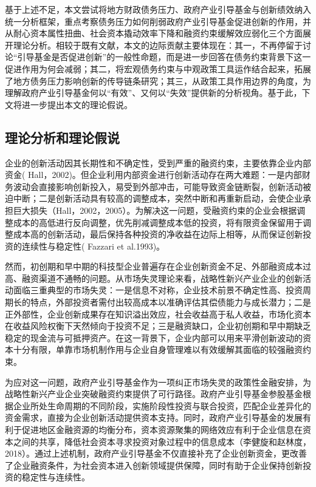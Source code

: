 \documentclass[UTF8,a4paper,zihao=5,fontset=fandol]{ctexart}
\begin{document}
基于上述不足，本文尝试将地方财政债务压力、政府产业引导基金与创新绩效纳入统一分析框架，重点考察债务压力如何削弱政府产业引导基金促进创新的作用，并从耐心资本属性扭曲、社会资本撬动效率下降和融资约束缓解效应弱化三个方面展开理论分析。相较于既有文献，本文的边际贡献主要体现在：其一，不再停留于讨论“引导基金是否促进创新”的一般性命题，而是进一步回答在债务约束背景下这一促进作用为何会减弱；其二，将宏观债务约束与中观政策工具运作结合起来，拓展了地方债务压力影响创新的传导链条研究；其三，从政策工具作用边界的角度，为理解政府产业引导基金何以“有效”、又何以“失效”提供新的分析视角。基于此，下文将进一步提出本文的理论假说。

\subsection{理论分析和理论假说}

企业的创新活动因其长期性和不确定性，受到严重的融资约束，主要依靠企业内部资金( Hall，2002)。但企业利用内部资金进行创新活动存在两大难题：一是内部财务波动会直接影响创新投入，易受到外部冲击，可能导致资金链断裂，创新活动被迫中断；二是创新活动具有较高的调整成本，突然中断和再重新启动，会使企业承担巨大损失（Hall，2002，2005）。为解决这一问题，受融资约束的企业会根据调整成本的高低进行反向调整，优先削减调整成本低的投资，将有限资金保留用于调整成本高的创新活动，最后保持各种投资的净收益在边际上相等，从而保证创新投资的连续性与稳定性( Fazzari et al.1993)。

然而，初创期和早中期的科技型企业普遍存在企业创新资金不足、外部融资成本过高、融资渠道不通畅的问题。从市场失灵理论来看，战略性新兴产业企业的创新活动面临三重典型的市场失灵：一是信息不对称，企业技术前景不确定性高、投资周期长的特点，外部投资者需付出较高成本以准确评估其偿债能力与成长潜力；二是正外部性，企业创新成果存在知识溢出效应，社会收益高于私人收益，市场化资本在收益风险权衡下天然倾向于投资不足；三是融资缺口，企业初创期和早中期缺乏稳定的现金流与可抵押资产。在这一背景下，企业内部可以用来平滑创新波动的资本十分有限，单靠市场机制作用与企业自身管理难以有效缓解其面临的较强融资约束。

为应对这一问题，政府产业引导基金作为一项纠正市场失灵的政策性金融安排，为战略性新兴产业企业突破融资约束提供了可行路径。政府产业引导基金参股基金根据企业所处生命周期的不同阶段，实施阶段性投资与联合投资，匹配企业差异化的资金需求，直接为企业创新活动提供资本支持。同时，政府产业引导基金的发展有利于促进地区金融资源的均衡分布，资本资源聚集的网络效应有利于企业信息在资本之间的共享，降低社会资本寻求投资对象过程中的信息成本（李健旋和赵林度，2018）。通过上述机制，政府产业引导基金不仅直接补充了企业创新资金，更改善了企业融资条件，为社会资本进入创新领域提供保障，同时有助于企业保持创新投资的稳定性与连续性。
\end{document}
